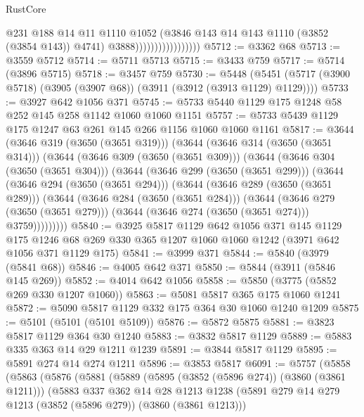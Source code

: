 \begin{lexlean}{RustCore}
\begin{coremodule}
                                      @231
                                      @188
                                      @14
                                      @11
                                      @1110
                                      @1052
                                      (@3846 @143 @14 @143 @1110 (@3852 (@3854 @143)) @4741)
                                      @3888)))))))))))))))))
@5712 := @3362 @68
@5713 := @3559 @5712
@5714 := @5711 @5713
@5715 := @3433 @759
@5717 := @5714 (@3896 @5715)
@5718 := @3457 @759
@5730 := @5448 (@5451 (@5717 (@3900 @5718) (@3905 (@3907 @68)) (@3911 (@3912 (@3913 @1129) @1129))))
@5733 := @3927 @642 @1056 @371
@5745 := @5733 @5440 @1129 @175 @1248 @58 @252 @145 @258 @1142 @1060 @1060 @1151
@5757 := @5733 @5439 @1129 @175 @1247 @63 @261 @145 @266 @1156 @1060 @1060 @1161
@5817 := @3644
    (@3646 @319 (@3650 (@3651 @319)))
    (@3644
      (@3646 @314 (@3650 (@3651 @314)))
      (@3644
        (@3646 @309 (@3650 (@3651 @309)))
        (@3644
          (@3646 @304 (@3650 (@3651 @304)))
          (@3644
            (@3646 @299 (@3650 (@3651 @299)))
            (@3644
              (@3646 @294 (@3650 (@3651 @294)))
              (@3644
                (@3646 @289 (@3650 (@3651 @289)))
                (@3644
                  (@3646 @284 (@3650 (@3651 @284)))
                  (@3644
                    (@3646 @279 (@3650 (@3651 @279)))
                    (@3644 (@3646 @274 (@3650 (@3651 @274))) @3759)))))))))
@5840 := @3925
    @5817
    @1129
    @642
    @1056
    @371
    @145
    @1129
    @175
    @1246
    @68
    @269
    @330
    @365
    @1207
    @1060
    @1060
    @1242
    (@3971 @642 @1056 @371 @1129 @175)
@5841 := @3999 @371
@5844 := @5840 (@3979 (@5841 @68))
@5846 := @4005 @642 @371
@5850 := @5844 (@3911 (@5846 @145 @269))
@5852 := @4014 @642 @1056
@5858 := @5850 (@3775 (@5852 @269 @330 @1207 @1060))
@5863 := @5081 @5817 @365 @175 @1060 @1241
@5872 := @5090 @5817 @1129 @332 @175 @364 @30 @1060 @1240 @1209
@5875 := @5101 (@5101 (@5101 @5109))
@5876 := @5872 @5875
@5881 := @3823 @5817 @1129 @364 @30 @1240
@5883 := @3832 @5817 @1129
@5889 := @5883 @335 @363 @14 @29 @1211 @1239
@5891 := @3844 @5817 @1129
@5895 := @5891 @274 @14 @274 @1211
@5896 := @3853 @5817
@6091 := @5757
    (@5858
      (@5863
        (@5876
          (@5881
            (@5889
              (@5895 (@3852 (@5896 @274)) (@3860 (@3861 @1211)))
              (@5883
                @337
                @362
                @14
                @28
                @1213
                @1238
                (@5891 @279 @14 @279 @1213 (@3852 (@5896 @279)) (@3860 (@3861 @1213)))

\end{coremodule}
\end{lexlean}
